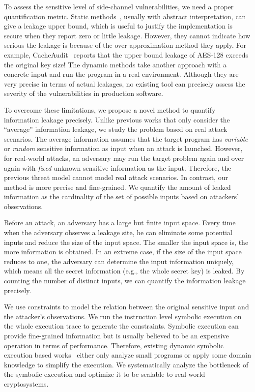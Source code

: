 To assess the sensitive level of side-channel vulnerabilities, we need a proper
quantification metric. Static methods~\cite{182946,5207642}, usually with
abstract interpretation, can give a leakage upper bound, which is useful to
justify the implementation is secure when they report zero or little leakage.
However, they cannot indicate how serious the leakage is because of the
over-approximation method they apply. For example, CacheAudit~\cite{182946} reports that the upper
bound leakage of AES-128 exceeds the original key size! The dynamic methods take
another approach with a concrete input and run the program in a real
environment. Although they are very precise in terms of actual leakages, no
existing tool can precisely assess the severity of the vulnerabilities in production
software. 

To overcome these limitations, we propose a novel method to quantify information
leakage precisely. Unlike previous works that only consider the
``average'' information leakage, we study the problem based on real attack
scenarios. The average information assumes that the target program has
\emph{variable} or \emph{random} sensitive information as input when an attack is
launched. However, for real-world attacks, an adversary may run the target
problem again and over again with \emph{fixed} unknown sensitive information
as the input. Therefore, the previous threat model cannot model real attack
scenarios. In contrast, our method is more precise and fine-grained. We quantify
the amount of leaked information as the cardinality of the set of possible
inputs based on attackers' observations.


Before an attack, an adversary has a large but finite input space. Every time
when the adversary observes a leakage site, he can eliminate some potential
inputs and reduce the size of the input space. The smaller the input space is,
the more information is obtained. In an extreme case, if the size of the
input space reduces to one, the adversary can determine the input information
uniquely, which means all the secret information (e.g., the whole secret key) is
leaked. By counting the number of distinct inputs, we can quantify the
information leakage precisely.

We use constraints to model the relation between the original sensitive input
and the attacker's observations. We run the instruction level symbolic execution on the
whole execution trace to generate the constraints. Symbolic execution can
provide fine-grained information but is usually believed to be an expensive
operation in terms of performance. Therefore, existing dynamic symbolic
execution based works~\cite{203878,236338,Brotzman19Casym} either only analyze
small programs or apply some domain knowledge to simplify the execution. We
systematically analyze the bottleneck of the symbolic execution and optimize it
to be scalable to real-world cryptosystems.

